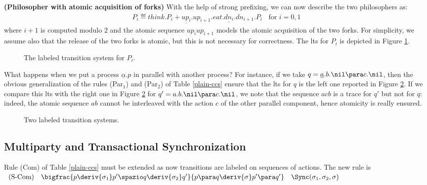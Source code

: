 \begin{example}\label{true-phil}{\bf (Philosopher with atomic acquisition of forks)}
With the help of strong prefixing, we can now describe the two philosophers as:
\begin{eqnarray*}
P_i \eqdef think.P_i + \underline{up_i}.up_{i+1}.eat.\underline{dn_i}.dn_{i+1}.P_i  \; \;  \mbox{   for  }i = 0, 1 
\end{eqnarray*}
where $i+1$ is computed modulo $2$ and  the atomic sequence $up_i up_{i+1}$ models the atomic 
acquisition of the two forks. For simplicity,
we assume also that the release of the two forks is atomic, but this is not necessary for correctness.
The lts for $P_i$ is depicted in Figure \ref{ltsphil}.
\fine
\end{example}

\begin{figure}[t]
\centering

\caption{The labeled transition system for $P_i$.}
\label{ltsphil}
\end{figure}

What happens when we put a process $\underline{\alpha}.p$ in parallel with another process? For instance, if we take 
$q = \underline{a}.b.\nil \para c.\nil$, then the obvious generalization of the rules (Par$_1$) and (Par$_2$) 
of Table \ref{plain-ccs} ensure that the lts for 
$q$ is the left one reported in Figure \ref{abc-atomic}. If we compare this lts with the right one in Figure \ref{abc-atomic} 
for $q' = a.b.\nil \para c.\nil$,
we note that the sequence $acb$ is a trace for $q'$ but not for $q$: indeed, the atomic sequence $ab$ cannot be interleaved
with the action $c$ of the other parallel component, hence atomicity is really ensured.

\begin{figure}[t]
\centering

\caption{Two labeled transition systems.}
\label{abc-atomic}
\end{figure}

\subsection{Multiparty and Transactional Synchronization}

Rule (Com) of Table \ref{plain-ccs} must be extended as now transitions are labeled on sequences of actions.
The new rule is\\

$\begin{array}{lcllcl}
\mbox{(S-Com)}  & \bigfrac{p\deriv{\sigma_1} p'\spazio q\deriv{\sigma_2}q'}{p
\para q \deriv{\sigma}p'\para q'} & \Sync(\sigma_1,  \sigma_2, \sigma) \\
\end{array}$\\

